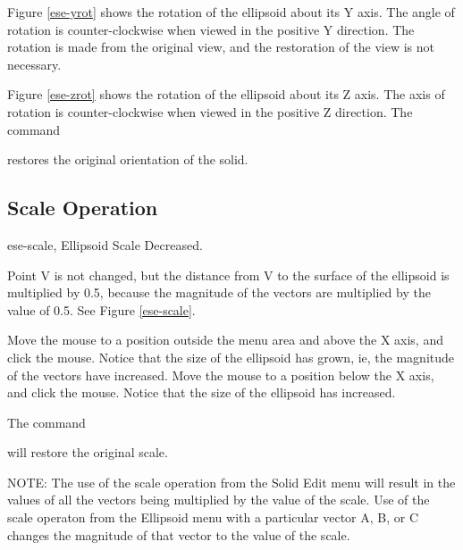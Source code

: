 Figure \ref{ese-yrot} shows the rotation of the ellipsoid about its Y axis.
The angle
of rotation is counter-clockwise when viewed in the positive Y direction.  The
rotation is made from the original view, and the restoration of the view is
not necessary.


Figure \ref{ese-zrot} shows the rotation of the ellipsoid about its Z axis.
The axis
of rotation is counter-clockwise when viewed in the positive Z direction.
The command


restores the original orientation of the solid.

\subsection{Scale Operation}
\mfig ese-scale, Ellipsoid Scale Decreased.


Point V is not changed,
but the distance from V to the surface of the ellipsoid is multiplied by 0.5,
because the magnitude of the vectors are multiplied by the value of 0.5.
See Figure \ref{ese-scale}.

Move the mouse to a position outside the menu area and above the X axis,
and click the mouse.
Notice that the size of the ellipsoid has grown, ie,
the magnitude of the vectors have increased.
Move the mouse to a position below the X axis, and click the mouse.
Notice that the size of the ellipsoid has increased.

The command


will restore the original scale.

NOTE:
The use
of the scale operation from the Solid Edit menu
will result in the values of all the vectors being
multiplied by the value of the scale.
Use of the scale operaton from the Ellipsoid menu
with a particular vector A, B, or C changes the
magnitude of that vector to the value of the scale.

